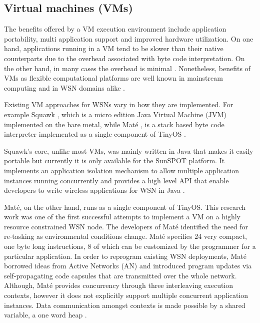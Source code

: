 \subsection{Virtual machines (VMs)}
The benefits offered by a VM execution environment include application portability, multi application support and improved hardware utilization. On one hand, applications running in a VM tend to be slower than their native counterparts due to the overhead associated with byte code interpretation. On the other hand, in many cases the overhead is minimal \cite{lange2011minimal}. Nonetheless, benefits of VMs as flexible computational platforms are well known in mainstream computing\cite{Montero2011750} and in WSN domains alike \cite{Brouwers:2009:DFV:1644038.1644056}.  

Existing VM approaches for WSNs vary in how they are implemented. For example Squawk \cite{simon2005squawk}, which is a micro edition Java Virtual Machine (JVM) implemented on the bare metal, while Maté \cite{Levis:2002:MTV:635506.605407}, is a stack based byte code interpreter implemented as a single component of TinyOS \cite{1630599}.

Squawk's core, unlike most VMs, was mainly written in Java that makes it easily portable but currently it is only available for the SunSPOT platform. It implements an application isolation mechanism to allow multiple application instances running concurrently and provides a high level API that enable developers to write wireless applications for WSN in Java \cite{simon2005squawk}.  
 
Maté, on the other hand, runs as a single component of TinyOS. This research work was one of the first successful attempts to implement a VM on a highly resource constrained WSN node. The developers of Maté identified the need for re-tasking as environmental conditions change. Maté specifies 24 very compact, one byte long instructions, 8 of which can be customized by the programmer for a particular application. In order to reprogram existing WSN deployments, Maté borrowed ideas from Active Networks (AN) \cite{tennenhouse2002towards} and introduced program updates via self-propagating code capsules that are transmitted over the whole network. 
Although, Maté provides concurrency through three interleaving execution contexts, however it does not explicitly support multiple concurrent application instances.  Data communication amongst contexts is made possible by a shared variable, a one word heap \cite{Levis:2002:MTV:635506.605407}. 


